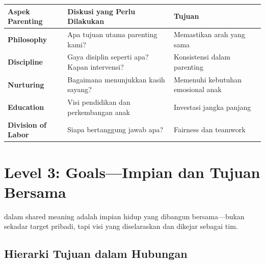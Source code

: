 \begin{center}
\renewcommand{\arraystretch}{1.5}
\begin{tabular}{|>{\raggedright}p{3.5cm}|>{\raggedright}p{5cm}|>{\raggedright\arraybackslash}p{6cm}|}
\hline
\rowcolor{sagegreen!20}
\textbf{Aspek Parenting} & \textbf{Diskusi yang Perlu Dilakukan} & \textbf{Tujuan} \\
\hline
\textbf{Philosophy} & Apa tujuan utama parenting kami? & Memastikan arah yang sama \\
\hline
\textbf{Discipline} & Gaya disiplin seperti apa? Kapan intervensi? & Konsistensi dalam parenting \\
\hline
\textbf{Nurturing} & Bagaimana menunjukkan kasih sayang? & Memenuhi kebutuhan emosional anak \\
\hline
\textbf{Education} & Visi pendidikan dan perkembangan anak & Investasi jangka panjang \\
\hline
\textbf{Division of Labor} & Siapa bertanggung jawab apa? & Fairness dan teamwork \\
\hline
\end{tabular}
\end{center}

\section{Level 3: Goals---Impian dan Tujuan Bersama}

 dalam shared meaning adalah impian hidup yang dibangun bersama---bukan sekadar target pribadi, tapi visi yang diselaraskan dan dikejar sebagai tim.

\subsection{Hierarki Tujuan dalam Hubungan}

